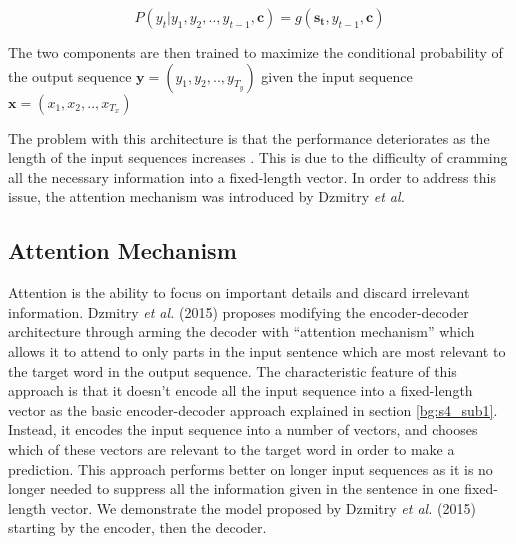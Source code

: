 \begin{equation}
\label{eq:19}
P(y_t | y_1, y_2,.., y_{t-1}, \mathbf{c}) = g(\mathbf{s_{t}}, y_{t-1}, \mathbf{c})
\end{equation}

The two components are then trained to maximize the conditional probability of the output sequence $\mathbf{y}=(y_1,y_2,..,y_{T_y})$ given the input sequence $ \mathbf{x}=(x_1,x_2,..,x_{T_x})$


The problem with this architecture is that the performance deteriorates as the length of the input sequences increases \cite{cho2014properties}. This is due to the difficulty of cramming all the necessary information into a fixed-length vector. In order to address this issue, the attention mechanism was introduced by Dzmitry \textit{et al.} \cite{bahdanau2014neural}


\subsection{Attention Mechanism} 
\label{bg:s4_sub2}

Attention is the ability to focus on important details and discard irrelevant information. Dzmitry \textit{et al.} (2015) \cite{bahdanau2014neural} proposes modifying the encoder-decoder architecture through arming the decoder with \enquote{attention mechanism} which allows it to attend to only parts in the input sentence which are most relevant to the target word in the output sequence. The characteristic feature of this approach is that it doesn't encode all the input sequence into a fixed-length vector as the basic encoder-decoder approach explained in section \ref{bg:s4_sub1}. Instead, it encodes the input sequence into a number of vectors, and chooses which of these vectors are relevant to the target word in order to make a prediction. This approach performs better on longer input sequences as it is no longer needed to suppress all the information given in the sentence in one fixed-length vector. We demonstrate the model proposed by Dzmitry \textit{et al.} (2015) \cite{bahdanau2014neural} starting by the encoder, then the decoder.


